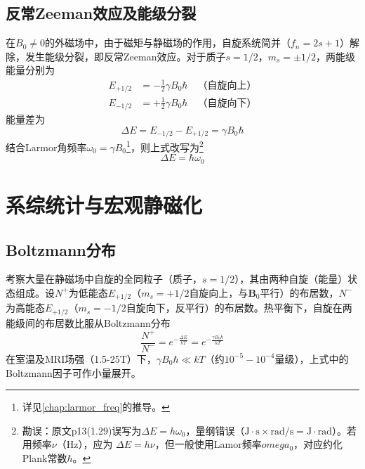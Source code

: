 \documentclass[12pt]{article}
\begin{document}
\subsection{反常Zeeman效应及能级分裂}
在$B_0\neq0$的外磁场中，由于磁矩与静磁场的作用，自旋系统简并（$f_n=2s+1$）解除，发生能级分裂，即反常Zeeman效应。对于质子$s=1/2$，$m_s=\pm1/2$，两能级能量分别为
\begin{align}
    E_{+1/2}&=-\frac{1}{2}\gamma B_0\hbar\quad（自旋向上）\\
    E_{-1/2}&=+\frac{1}{2}\gamma B_0\hbar\quad（自旋向下）
\end{align}
能量差为
\begin{equation}
    \Delta E=E_{-1/2}-E_{+1/2}=\gamma B_0\hbar
\end{equation}
结合Larmor角频率$\omega_0=\gamma B_0$\footnote{详见\autoref{chap:larmor_freq}的推导。}，则上式改写为\footnote{勘误：原文p13(1.29)误写为$\Delta E=h\omega_0$，量纲错误（$\mathrm{J·s\times rad/s}=\mathrm{J·rad}$）。若用频率$\nu$（Hz），应为 $\Delta E=h\nu$，但一般使用Lamor频率$omega_0$，对应约化Plank常数$\hbar$。}
\begin{equation}
    \boxed{\Delta E=\hbar\omega_0}
\end{equation}

\section{系综统计与宏观静磁化}
\subsection{Boltzmann分布}
考察大量在静磁场中自旋的全同粒子（质子，$s=1/2$），其由两种自旋（能量）状态组成。设$N^+$为低能态$E_{+1/2}$（$m_s=+1/2$自旋向上，与$\bm{B}_0$平行）的布居数，$N^-$为高能态$E_{+1/2}$（$m_s=-1/2$自旋向下，反平行）的布居数。热平衡下，自旋在两能级间的布居数比服从Boltzmann分布
\begin{equation}
    \frac{N^+}{N^-}=e^{-\frac{\Delta E}{kT}}=e^{-\frac{\gamma B_0\hbar}{kT}}
    \label{equ:boltzmann}
\end{equation}
在室温及MRI场强（1.5-25T）下，$\gamma B_0\hbar\ll kT$（约$10^{-5}-10^{-4}$量级），上式中的Boltzmann因子可作小量展开。
\end{document}

